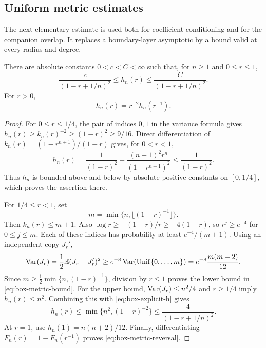 \subsection{Uniform metric estimates}

The next elementary estimate is used both for coefficient conditioning and
for the companion overlap. It replaces a boundary-layer asymptotic by a bound
valid at every radius and degree.

\begin{lemma}\label{lem:box-metric-bound}
There are absolute constants $0<c<C<\infty$ such that, for $n\ge1$ and
$0\le r\le1$,
\begin{equation}\label{eq:box-metric-bound}
 \frac{c}{(1-r+1/n)^2}\le h_n(r)
 \le\frac{C}{(1-r+1/n)^2}.
\end{equation}
For $r>0$,
\begin{equation}\label{eq:box-metric-reversal}
 h_n(r)=r^{-2}h_n(r^{-1}).
\end{equation}
\end{lemma}
\begin{proof}
For $0\le r\le1/4$, the pair of indices $0,1$ in the variance formula gives
$h_n(r)\ge k_n(r)^{-2}\ge(1-r)^2\ge9/16$. Direct differentiation of
$k_n(r)=(1-r^{n+1})/(1-r)$ gives, for $0<r<1$,
\begin{equation}\label{eq:box-explicit-h}
 h_n(r)=\frac1{(1-r)^2}
       -\frac{(n+1)^2r^n}{(1-r^{n+1})^2}
 \le\frac1{(1-r)^2}.
\end{equation}
Thus $h_n$ is bounded above and below by absolute positive constants on
$[0,1/4]$, which proves the assertion there.

For $1/4\le r<1$, set
\[
 m=\min\{n,\lfloor(1-r)^{-1}\rfloor\}.
\]
Then $k_n(r)\le m+1$. Also $\log r\ge-(1-r)/r\ge-4(1-r)$, so
$r^j\ge e^{-4}$ for $0\le j\le m$. Each of these indices has probability
at least $e^{-4}/(m+1)$. Using an independent copy $J_r'$,
\[
 \operatorname{Var}(J_r)=\frac12\mathbb E(J_r-J_r')^2
 \ge e^{-8}\operatorname{Var}(\operatorname{Unif}\{0,\ldots,m\})
 =e^{-8}\frac{m(m+2)}{12}.
\]
Since $m\ge\tfrac12\min\{n,(1-r)^{-1}\}$, division by $r\le1$
proves the lower bound in \eqref{eq:box-metric-bound}.
For the upper bound, $\operatorname{Var}(J_r)\le n^2/4$ and $r\ge1/4$ imply
$h_n(r)\le n^2$. Combining this with \eqref{eq:box-explicit-h} gives
\[
 h_n(r)\le\min\{n^2,(1-r)^{-2}\}
 \le\frac4{(1-r+1/n)^2}.
\]
At $r=1$, use $h_n(1)=n(n+2)/12$. Finally, differentiating
$F_n(r)=1-F_n(r^{-1})$ proves \eqref{eq:box-metric-reversal}.
\end{proof}

